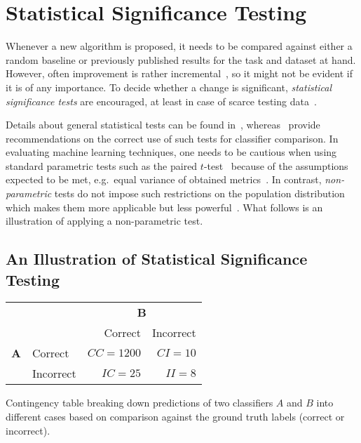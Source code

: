 \section{Statistical Significance Testing}

Whenever a new algorithm is proposed, it needs to be compared against either a random baseline or previously published results for the task and dataset at hand.
However, often improvement is rather incremental~\citep{Hand2006}, so it might not be evident if it is of any importance.
To decide whether a change is significant, \emph{statistical significance tests} are encouraged, at least in case of scarce testing data~\citep{Drummond2010}.

Details about general statistical tests can be found in~\citep{Urdan2011}, whereas~\citet{Japkowic2011} provide recommendations on the correct use of such tests for classifier comparison.
In evaluating machine learning techniques, one needs to be cautious when using standard parametric tests such as the paired $t$-test~\citep{Urdan2011} because of the assumptions expected to be met, e.g.\ equal variance of obtained metrics~\citep{Japkowic2011}. In contrast, \emph{non-parametric} tests do not impose such restrictions on the population distribution which makes them more applicable but less powerful~\citep{Colquhoun1971}.
What follows is an illustration of applying a non-parametric test.
%

\subsection{An Illustration of Statistical Significance Testing}
\begin{margintable}
    \begin{tabular}{llrr}
        \toprule
        & & \multicolumn{2}{c}{\textbf{B}} \\
        & & Correct & Incorrect \\ \midrule
        \textbf{A} & Correct & $CC = 1200$ & $CI = 10$ \\
        & Incorrect & $IC = 25$   & $II = 8$  \\
        \bottomrule
    \end{tabular}
    \caption{Contingency table breaking down predictions of two classifiers $A$ and $B$ into different cases based on comparison against the ground truth labels (correct or incorrect).}
    \label{tab:eval-mcnemar-table}
\end{margintable}

